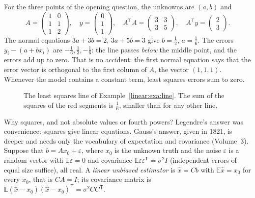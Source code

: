 \begin{example}\label{linear:exa:line}
For the three points of the opening question, the unknowns are $(a,b)$ and
\[
A=\begin{pmatrix}1&0\\1&1\\1&2\end{pmatrix},\quad y=\begin{pmatrix}0\\1\\1\end{pmatrix},\quad
A^{\mathsf T}A=\begin{pmatrix}3&3\\3&5\end{pmatrix},\quad A^{\mathsf T}y=\begin{pmatrix}2\\3\end{pmatrix}.
\]
The normal equations $3a+3b=2$, $3a+5b=3$ give $b=\frac12$, $a=\frac16$. The errors $y_i-(a+bx_i)$ are $-\frac16,\frac13,
-\frac16$: the line passes \emph{below} the middle point, and the errors add up to zero. That is no accident: the first
normal equation says that the error vector is orthogonal to the first column of $A$, the vector $(1,1,1)$. Whenever
the model contains a constant term, least squares errors sum to zero.
\end{example}

\begin{figure}[ht]
\centering
{}
\caption{The least squares line of Example~\ref{linear:exa:line}. The sum of the squares of the red segments is $\frac16$,
smaller than for any other line.}
\label{linear:fig:lsq}
\end{figure}

Why squares, and not absolute values or fourth powers? Legendre's answer was convenience: squares give linear equations.
Gauss's answer, given in 1821, is deeper and needs only the vocabulary of expectation and covariance (Volume~3). Suppose
that $b=Ax_0+\varepsilon$, where $x_0$ is the unknown truth and the noise $\varepsilon$ is a random vector with
$\mathbb E\varepsilon=0$ and covariance $\mathbb E\varepsilon\varepsilon^{\mathsf T}=\sigma^2I$ (independent errors of
equal size suffice), all real. A \emph{linear unbiased estimator} is $\hat x=Cb$ with $\mathbb E\hat x=x_0$ for every
$x_0$, that is $CA=I$; its covariance matrix is $\mathbb E(\hat x-x_0)(\hat x-x_0)^{\mathsf T}=\sigma^2CC^{\mathsf T}$.

